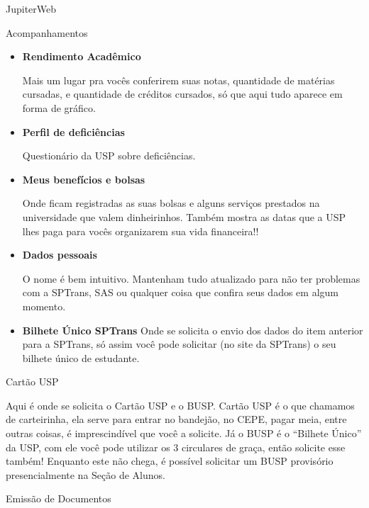 \begin{secao}{JupiterWeb}
\begin{subsecao}{Acompanhamentos}
\begin{itemize}
    É o jeito visual de acompanhar as disciplinas que vocês já fizeram ou que
    estão faltando. Sua principal função é ser printado ao final do curso (com
    tudo verde) para postar no Instagram e fazer sucesso com a família na
    internet.
  \item \textbf{Rendimento Acadêmico}

    Mais um lugar pra vocês conferirem suas notas, quantidade de matérias
    cursadas, e quantidade de créditos cursados, só que aqui tudo aparece em
    forma de gráfico.
  \item \textbf{Perfil de deficiências}

    Questionário da USP sobre deficiências.

  \item \textbf{Meus benefícios e bolsas}

    Onde ficam registradas as suas bolsas e alguns serviços prestados na
    universidade que valem dinheirinhos. Também mostra as datas que a USP lhes
    paga para vocês organizarem sua vida financeira!!

  \item \textbf{Dados pessoais}

    O nome é bem intuitivo. Mantenham tudo atualizado para não ter problemas com
    a SPTrans, SAS ou qualquer coisa que confira seus dados em algum momento.

  \item \textbf{Bilhete Único SPTrans}
    Onde se solicita o envio dos dados do item anterior para a SPTrans, só assim
    você pode solicitar (no site da SPTrans) o seu bilhete único de estudante.

\end{itemize}

\end{subsecao}

\begin{subsecao}{Cartão USP}

Aqui é onde se solicita o Cartão USP e o BUSP. Cartão USP é o que chamamos de
carteirinha, ela serve para entrar no bandejão, no CEPE, pagar meia, entre outras
coisas, é imprescindível que você a solicite. Já o BUSP é o ``Bilhete Único'' da USP,
com ele você pode utilizar os 3 circulares de graça, então solicite esse também!
Enquanto este não chega, é possível solicitar um BUSP provisório presencialmente na 
Seção de Alunos.

\end{subsecao}

\begin{subsecao}{Emissão de Documentos}


\end{subsecao}
\end{secao}
